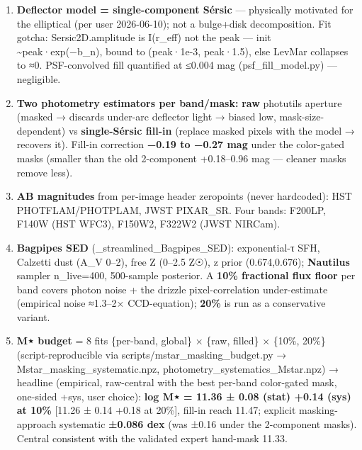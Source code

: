 \documentclass[
]{article}
\newcommand{\BreakablePath}[1]{{\ttfamily\sloppy #1}}
\begin{document}
\begin{enumerate}
  \emph{red} passive deflector contrast keeps only genuine source
  pixels. See §2.1.1b for the detailed rationale + caveats.
\item
  \textbf{Deflector model = single-component Sérsic} --- physically
  motivated for the elliptical (per user 2026-06-10); not a bulge+disk
  decomposition. Fit gotcha:
  \BreakablePath{Sersic2D.\discretionary{}{}{}amplitude} is I(r\_eff)
  not the peak --- init \textasciitilde peak·exp(−b\_n), bound to
  (peak·1e-3, peak·1.5), else LevMar collapses to ≈0. PSF-convolved fill
  quantified at ≤0.004 mag
  (\BreakablePath{psf\_\discretionary{}{}{}fill\_\discretionary{}{}{}model.\discretionary{}{}{}py})
  --- negligible.
\item
  \textbf{Two photometry estimators per band/mask:} \textbf{raw}
  \BreakablePath{photutils} aperture (masked → discards under-arc
  deflector light → biased low, mask-size-dependent) vs
  \textbf{single-Sérsic fill-in} (replace masked pixels with the model →
  recovers it). Fill-in correction \textbf{−0.19 to −0.27 mag} under the
  color-gated masks (smaller than the old 2-component +0.18--0.96 mag
  --- cleaner masks remove less).
\item
  \textbf{AB magnitudes} from per-image header zeropoints (never
  hardcoded): HST \BreakablePath{PHOTFLAM/\discretionary{}{}{}PHOTPLAM},
  JWST \BreakablePath{PIXAR\_\discretionary{}{}{}SR}. Four bands:
  F200LP, F140W (HST WFC3), F150W2, F322W2 (JWST NIRCam).
\item
  \textbf{Bagpipes SED}
  (\BreakablePath{02\_\discretionary{}{}{}streamlined\_\discretionary{}{}{}Bagpipes\_\discretionary{}{}{}SED}):
  exponential-τ SFH, Calzetti dust (A\_V 0--2), free Z (0--2.5 Z☉), z
  prior (0.674,0.676); \textbf{Nautilus} sampler n\_live=400, 500-sample
  posterior. A \textbf{10\% fractional flux floor} per band covers
  photon noise + the drizzle pixel-correlation under-estimate (empirical
  noise ≈1.3--2× CCD-equation); \textbf{20\%} is run as a conservative
  variant.
\item
  \textbf{M⋆ budget} = 8 fits \{per-band, global\} × \{raw, filled\} ×
  \{10\%, 20\%\} (script-reproducible via
  \BreakablePath{scripts/\discretionary{}{}{}mstar\_\discretionary{}{}{}masking\_\discretionary{}{}{}budget.\discretionary{}{}{}py}
  →
  \BreakablePath{Mstar\_\discretionary{}{}{}masking\_\discretionary{}{}{}systematic.\discretionary{}{}{}npz},
  \BreakablePath{photometry\_\discretionary{}{}{}systematics\_\discretionary{}{}{}Mstar.\discretionary{}{}{}npz})
  → headline (empirical, raw-central with the best per-band color-gated
  mask, one-sided +sys, user choice): \textbf{log M⋆ = 11.36 ± 0.08
  (stat) +0.14 (sys) at 10\%} {[}11.26 ± 0.14 +0.18 at 20\%{]}, fill-in
  reach 11.47; explicit masking-approach systematic \textbf{±0.086 dex}
  (was ±0.16 under the 2-component masks). Central consistent with the
  validated expert hand-mask 11.33.
\end{enumerate}
\end{document}
